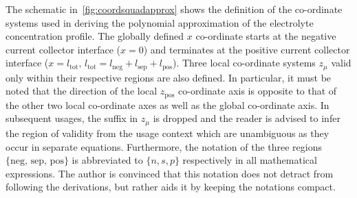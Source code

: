 The  schematic  in~\cref{fig:coordsquadapprox}  shows   the  definition  of  the
co-ordinate  systems  used  in  deriving the  polynomial  approximation  of  the
electrolyte concentration  profile. The globally defined  $x$ co-ordinate starts
at  the negative  current  collector  interface ($x=0$)  and  terminates at  the
positive  current  collector  interface  ($x =  l_\text{tot},\,  l_\text{tot}  =
l_\text{neg} +  l_\text{sep} +  l_\text{pos}$). Three local  co-ordinate systems
$z_\mu$  valid  only  within  their  respective regions  are  also  defined.  In
particular, it  must be  noted that  the direction  of the  local $z_\text{pos}$
co-ordinate axis is opposite to that of  the other two local co-ordinate axes as
well as the global co-ordinate axis. In subsequent usages, the suffix in $z_\mu$
is dropped and  the reader is advised  to infer the region of  validity from the
usage  context  which are  unambiguous  as  they  occur in  separate  equations.
Furthermore, the  notation of  the three regions  $\{\text{neg, sep,  pos}\}$ is
abbreviated  to $\{n,s,p\}$  respectively in  all mathematical  expressions. The
author  is convinced  that this  notation does  not detract  from following  the
derivations, but rather aids it by keeping the notations compact.

